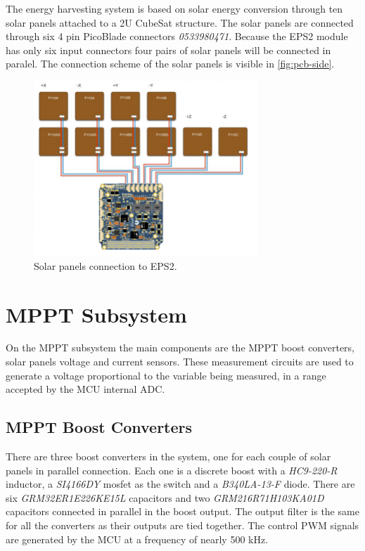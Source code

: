 The energy harvesting system is based on solar energy conversion through ten solar panels attached to a 2U CubeSat structure. The solar panels are connected through six 4 pin PicoBlade connectors \textit{0533980471}. Because the EPS2 module has only six input connectors four pairs of solar panels will be connected in paralel. The connection scheme of the solar panels is visible in \autoref{fig:pcb-side}.

\begin{figure}[!ht]
    \begin{center}
        \includegraphics[width=0.75\textwidth]{figures/diagram-solar-panels.png}
        \caption{Solar panels connection to EPS2.}
        \label{fig:diagram-solar-panels}
    \end{center}
\end{figure}

\section{MPPT Subsystem}

On the MPPT subsystem the main components are the MPPT boost converters, solar panels voltage and current sensors. These measurement circuits are used to generate a voltage proportional to the variable being measured, in a range accepted by the MCU internal ADC.

\subsection{MPPT Boost Converters}

There are three boost converters in the system, one for each couple of solar panels in parallel connection. Each one is a discrete boost with a \textit{HC9-220-R} inductor, a \textit{SI4166DY} mosfet as the switch and a \textit{B340LA-13-F} diode. There are six \textit{GRM32ER1E226KE15L} capacitors and two \textit{GRM216R71H103KA01D} capacitors connected in parallel in the boost output. The output filter is the same for all the converters as their outputs are tied together. The control PWM signals are generated by the MCU at a frequency of nearly 500 kHz.

